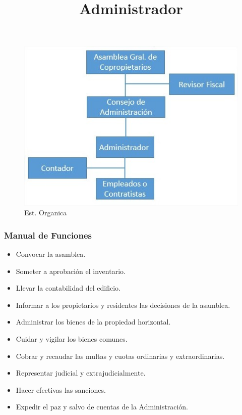 \begin{figure}[th!]
	\centering
	\includegraphics[width=0.7\linewidth]{arquitectura/organizacion/imgs/organigrama}
	\caption{Est. Organica}	
\end{figure}



\subsubsection{Manual de Funciones}

\title{Administrador}


\begin{itemize}
\item Convocar la asamblea.
\item Someter a aprobación el inventario.
\item Llevar la contabilidad del edificio.
\item Informar a los propietarios y residentes las decisiones de la asamblea.
\item Administrar los bienes de la propiedad horizontal.
\item Cuidar y vigilar los bienes comunes.
\item Cobrar y recaudar las multas y cuotas ordinarias y extraordinarias.
\item Representar judicial y extrajudicialmente.
\item Hacer efectivas las sanciones.
\item Expedir el paz y salvo de cuentas de la Administración.
\end{itemize}


